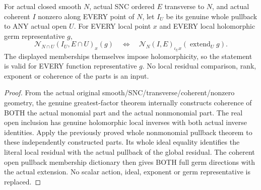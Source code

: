 \begin{lemma}
\label{hir:sharp-actual-nonmonomial-whole-open-germ-dictionary}
\leanok
For actual closed smooth $N$, actual SNC ordered $E$ transverse to $N$,
and actual coherent $I$ nonzero along EVERY point of $N$, let $I_U$
be its genuine whole pullback to ANY actual open $U$. For EVERY local
point $x$ and EVERY local holomorphic germ representative $g$,
\[
 \mathcal N_{N\cap U}(I_U,E\cap U)_x(g)
 \quad\Longleftrightarrow\quad
 \mathcal N_N(I,E)_{\iota_Ux}(\operatorname{extend}_Ug).
\]
The displayed memberships themselves impose holomorphicity, so the
statement is valid for EVERY function representative $g$. No local
residual comparison, rank, exponent or coherence of the parts is an input.
\end{lemma}
\begin{proof}
From the actual original smooth/SNC/transverse/coherent/nonzero geometry,
the genuine greatest-factor theorem internally constructs coherence of
BOTH the actual monomial part and the actual nonmonomial part. The real
open inclusion has genuine holomorphic local inverses with both actual
inverse identities. Apply the previously proved whole nonmonomial
pullback theorem to these independently constructed parts. Its whole
ideal equality identifies the literal local residual with the actual
pullback of the global residual. The coherent open pullback membership
dictionary then gives BOTH full germ directions with the actual extension.
No scalar action, ideal, exponent or germ representative is replaced.
\end{proof}

